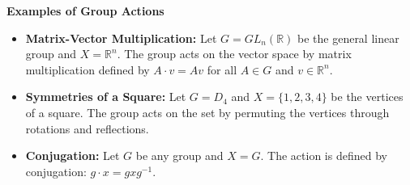 \documentclass[a4paper,12pt]{article}
\begin{document}
\textbf{Examples of Group Actions}
\begin{itemize}
    \item \textbf{Matrix-Vector Multiplication:} Let $G = GL_n(\mathbb{R})$ be the general linear group and $X = \mathbb{R}^n$. The group acts on the vector space by matrix multiplication defined by $A \cdot v = Av$ for all $A \in G$ and $v \in \mathbb{R}^n$.
    \item \textbf{Symmetries of a Square:} Let $G = D_4$ and $X = \{1, 2, 3, 4\}$ be the vertices of a square. The group acts on the set by permuting the vertices through rotations and reflections.
    \item \textbf{Conjugation:} Let $G$ be any group and $X = G$. The action is defined by conjugation: $g \cdot x = gxg^{-1}$.
\end{itemize}
\end{document}
